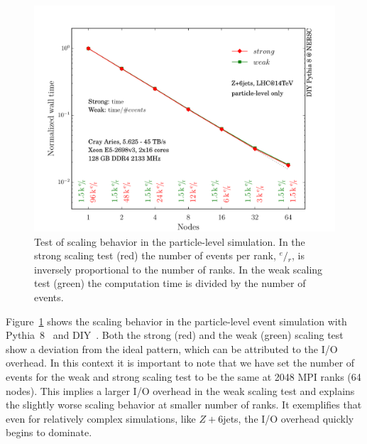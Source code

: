\documentclass[aps,prd,twocolumn,fleqn,superscriptaddress,groupedaddress,nofootinbib,preprintnumbers]{revtex4}
\begin{document}
\begin{figure}[t]
    \centering
    \includegraphics[width=\linewidth]{fig/pl_scale.pdf}
    \caption{Test of scaling behavior in the particle-level simulation.
      In the strong scaling test (red) the number of events per rank, $^e\!/\!_r$,
      is inversely proportional to the number of ranks. In the weak scaling test (green)
      the computation time is divided by the number of events.}
    \label{fig:pl_scaling}
\end{figure}
Figure~\ref{fig:pl_scaling} shows the scaling behavior in the particle-level
event simulation with Pythia~8~\cite{Sjostrand:2014zea}
and DIY~\cite{morozov_ldav16}.
Both the strong (red) and the weak (green) scaling test show a deviation
from the ideal pattern, which can be attributed to the I/O overhead.
In this context it is important to note that we have set the number of events
for the weak and strong scaling test to be the same at 2048 MPI ranks (64 nodes).
This implies a larger I/O overhead in the weak scaling test and explains
the slightly worse scaling behavior at smaller number of ranks.
It exemplifies that even for relatively complex simulations, like $Z+6$jets,
the I/O overhead quickly begins to dominate.
\end{document}
